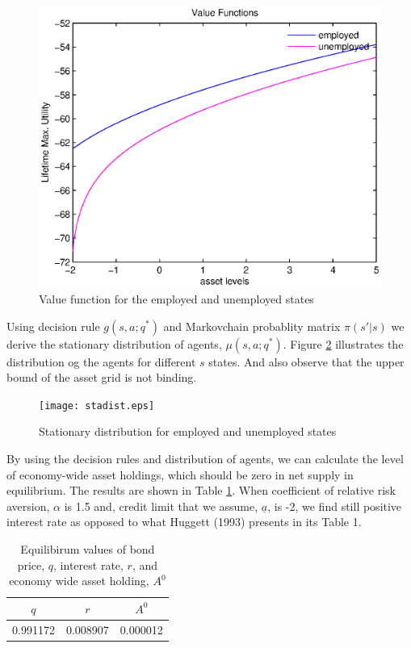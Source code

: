 \documentclass[a4paper,10pt,12pt]{article}%
\begin{document}
\begin{figure}[H]
\centering
   \includegraphics[scale=1]{valuefnc.eps} 
  \begin{center}
   \caption{Value function for the employed and unemployed states }
   \label{value}
  \end{center}
\end{figure}
Using decision rule $g(s,a;q^*)$ and Markovchain probablity matrix $\pi(s'|s)$ we derive the stationary distribution of agents, $\mu(s,a;q^*)$. Figure \ref{stadist} illustrates the distribution og the agents for different $s$ states. And also observe that the upper bound of the asset grid is not binding.
\begin{figure}[H]
\centering
   \texttt{[image: stadist.eps]} 
  \begin{center}
   \caption{Stationary distribution for employed and unemployed states }
   \label{stadist}
  \end{center}
\end{figure}
By using the decision rules and distribution of agents, we can calculate the level of economy-wide asset holdings, which should be zero in net supply in equilibrium. The results are shown in Table \ref{tab:results}. When coefficient of relative risk aversion, $\alpha$ is 1.5 and, credit limit that we assume, $\underline{a}$, is -2, we find still positive interest rate as opposed to what Huggett (1993) presents in its Table 1. 
\begin{table}[htbp]
  \centering
  \caption{Equilibirum values of bond price, $q$, interest rate, $r$, and economy wide asset holding, $A^0$}
    \begin{tabular}{|c|c|c|}
    \hline
    $q$     & $r$     & $A^0$      \\
    \hline
    \hline
    0.991172 & 0.008907 & 0.000012 \\
    \hline
    \end{tabular}%
  \label{tab:results}%
\end{table}%
\end{document}
